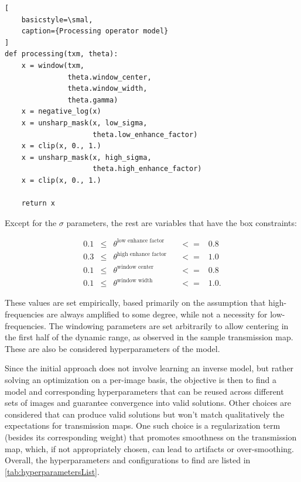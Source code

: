\documentclass[nomenclature, english, bibtex]{kththesis}
\numberwithin{listing}{chapter}
\begin{document}
\begin{lstlisting}[
    basicstyle=\smal,
    caption={Processing operator model}
]
def processing(txm, theta):
    x = window(txm, 
               theta.window_center,
               theta.window_width,
               theta.gamma)
    x = negative_log(x)
    x = unsharp_mask(x, low_sigma,
                     theta.low_enhance_factor)
    x = clip(x, 0., 1.)
    x = unsharp_mask(x, high_sigma,
                     theta.high_enhance_factor)
    x = clip(x, 0., 1.)

    return x
\end{lstlisting}

Except for the $\sigma$ parameters, the rest are variables that
have the box constraints:

\begin{equation}
\begin{aligned}
    0.1&  \leq & \theta^{\text{low enhance factor}} && <= &0.8 \\
    0.3 & \leq  &\theta^{\text{high enhance factor}}& & <= &1.0 \\
    0.1 & \leq  &\theta^{\text{window center}} & &<= &0.8 \\
    0.1  &\leq  &\theta^{\text{window width}}&& <= &1.0.
\end{aligned}
\end{equation}

These values are set empirically, based primarily on the assumption that high-frequencies are always amplified to some degree, while not a necessity for low-frequencies. The windowing parameters are set arbitrarily to allow centering in the first
half of the dynamic range, as observed in the sample transmission map. These are also be considered hyperparameters of the model.

Since the initial approach does not involve learning an inverse model, but rather solving an optimization
on a per-image basis, the objective is then to find a model and corresponding hyperparameters that can be reused across different
sets of images and guarantee convergence into valid solutions. Other  choices are considered that can produce valid solutions but won't match qualitatively
the expectations for transmission maps. One such choice is a regularization term (besides its corresponding weight)
that promotes smoothness on the transmission map, which, if not appropriately chosen, can lead to artifacts or over-smoothing.
Overall, the hyperparameters and configurations to find are listed in \autoref{tab:hyperparametersList}.
\end{document}
